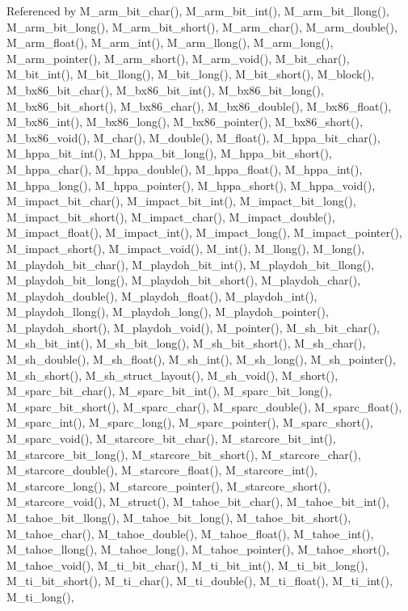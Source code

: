 Referenced by M\_\-arm\_\-bit\_\-char(), M\_\-arm\_\-bit\_\-int(), M\_\-arm\_\-bit\_\-llong(), M\_\-arm\_\-bit\_\-long(), M\_\-arm\_\-bit\_\-short(), M\_\-arm\_\-char(), M\_\-arm\_\-double(), M\_\-arm\_\-float(), M\_\-arm\_\-int(), M\_\-arm\_\-llong(), M\_\-arm\_\-long(), M\_\-arm\_\-pointer(), M\_\-arm\_\-short(), M\_\-arm\_\-void(), M\_\-bit\_\-char(), M\_\-bit\_\-int(), M\_\-bit\_\-llong(), M\_\-bit\_\-long(), M\_\-bit\_\-short(), M\_\-block(), M\_\-bx86\_\-bit\_\-char(), M\_\-bx86\_\-bit\_\-int(), M\_\-bx86\_\-bit\_\-long(), M\_\-bx86\_\-bit\_\-short(), M\_\-bx86\_\-char(), M\_\-bx86\_\-double(), M\_\-bx86\_\-float(), M\_\-bx86\_\-int(), M\_\-bx86\_\-long(), M\_\-bx86\_\-pointer(), M\_\-bx86\_\-short(), M\_\-bx86\_\-void(), M\_\-char(), M\_\-double(), M\_\-float(), M\_\-hppa\_\-bit\_\-char(), M\_\-hppa\_\-bit\_\-int(), M\_\-hppa\_\-bit\_\-long(), M\_\-hppa\_\-bit\_\-short(), M\_\-hppa\_\-char(), M\_\-hppa\_\-double(), M\_\-hppa\_\-float(), M\_\-hppa\_\-int(), M\_\-hppa\_\-long(), M\_\-hppa\_\-pointer(), M\_\-hppa\_\-short(), M\_\-hppa\_\-void(), M\_\-impact\_\-bit\_\-char(), M\_\-impact\_\-bit\_\-int(), M\_\-impact\_\-bit\_\-long(), M\_\-impact\_\-bit\_\-short(), M\_\-impact\_\-char(), M\_\-impact\_\-double(), M\_\-impact\_\-float(), M\_\-impact\_\-int(), M\_\-impact\_\-long(), M\_\-impact\_\-pointer(), M\_\-impact\_\-short(), M\_\-impact\_\-void(), M\_\-int(), M\_\-llong(), M\_\-long(), M\_\-playdoh\_\-bit\_\-char(), M\_\-playdoh\_\-bit\_\-int(), M\_\-playdoh\_\-bit\_\-llong(), M\_\-playdoh\_\-bit\_\-long(), M\_\-playdoh\_\-bit\_\-short(), M\_\-playdoh\_\-char(), M\_\-playdoh\_\-double(), M\_\-playdoh\_\-float(), M\_\-playdoh\_\-int(), M\_\-playdoh\_\-llong(), M\_\-playdoh\_\-long(), M\_\-playdoh\_\-pointer(), M\_\-playdoh\_\-short(), M\_\-playdoh\_\-void(), M\_\-pointer(), M\_\-sh\_\-bit\_\-char(), M\_\-sh\_\-bit\_\-int(), M\_\-sh\_\-bit\_\-long(), M\_\-sh\_\-bit\_\-short(), M\_\-sh\_\-char(), M\_\-sh\_\-double(), M\_\-sh\_\-float(), M\_\-sh\_\-int(), M\_\-sh\_\-long(), M\_\-sh\_\-pointer(), M\_\-sh\_\-short(), M\_\-sh\_\-struct\_\-layout(), M\_\-sh\_\-void(), M\_\-short(), M\_\-sparc\_\-bit\_\-char(), M\_\-sparc\_\-bit\_\-int(), M\_\-sparc\_\-bit\_\-long(), M\_\-sparc\_\-bit\_\-short(), M\_\-sparc\_\-char(), M\_\-sparc\_\-double(), M\_\-sparc\_\-float(), M\_\-sparc\_\-int(), M\_\-sparc\_\-long(), M\_\-sparc\_\-pointer(), M\_\-sparc\_\-short(), M\_\-sparc\_\-void(), M\_\-starcore\_\-bit\_\-char(), M\_\-starcore\_\-bit\_\-int(), M\_\-starcore\_\-bit\_\-long(), M\_\-starcore\_\-bit\_\-short(), M\_\-starcore\_\-char(), M\_\-starcore\_\-double(), M\_\-starcore\_\-float(), M\_\-starcore\_\-int(), M\_\-starcore\_\-long(), M\_\-starcore\_\-pointer(), M\_\-starcore\_\-short(), M\_\-starcore\_\-void(), M\_\-struct(), M\_\-tahoe\_\-bit\_\-char(), M\_\-tahoe\_\-bit\_\-int(), M\_\-tahoe\_\-bit\_\-llong(), M\_\-tahoe\_\-bit\_\-long(), M\_\-tahoe\_\-bit\_\-short(), M\_\-tahoe\_\-char(), M\_\-tahoe\_\-double(), M\_\-tahoe\_\-float(), M\_\-tahoe\_\-int(), M\_\-tahoe\_\-llong(), M\_\-tahoe\_\-long(), M\_\-tahoe\_\-pointer(), M\_\-tahoe\_\-short(), M\_\-tahoe\_\-void(), M\_\-ti\_\-bit\_\-char(), M\_\-ti\_\-bit\_\-int(), M\_\-ti\_\-bit\_\-long(), M\_\-ti\_\-bit\_\-short(), M\_\-ti\_\-char(), M\_\-ti\_\-double(), M\_\-ti\_\-float(), M\_\-ti\_\-int(), M\_\-ti\_\-long(), 